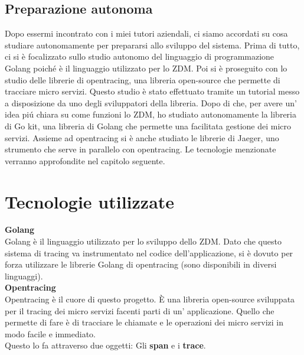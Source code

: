 \documentclass[a4paper,12pt,titlepage,italian,openany]{report}
\begin{document}
\section{Preparazione autonoma}
Dopo essermi incontrato con i miei tutori aziendali, ci siamo accordati su cosa studiare autonomamente per prepararsi allo sviluppo del sistema.
Prima di tutto, ci si è focalizzato  sullo studio autonomo del linguaggio di programmazione Golang poiché è il linguaggio utilizzato per lo ZDM\cite{zdm:1}.
Poi si è proseguito con lo studio delle librerie di opentracing, una libreria open-source che permette di tracciare micro servizi.
Questo studio è stato effettuato tramite un tutorial\cite{opentracing:2} messo a disposizione da uno degli sviluppatori della libreria. Dopo di che, per avere un' idea piú chiara su come funzioni lo ZDM,
ho studiato autonomamente la libreria di Go kit\cite{go:2}, una libreria di Golang che permette una facilitata gestione dei micro servizi.
Assieme ad opentracing si è anche studiato le librerie di Jaeger\cite{jaeger:1}, uno strumento che serve in parallelo con opentracing.
Le tecnologie menzionate verranno approfondite nel capitolo seguente.
\chapter{Tecnologie utilizzate}
\textbf{Golang}\\
Golang\cite{go:1} è il linguaggio utilizzato per lo sviluppo dello ZDM. Dato che questo sistema di tracing va instrumentato nel codice dell'applicazione, si è dovuto per forza utilizzare le librerie
Golang di opentracing (sono disponibili in diversi linguaggi).\\[12pt]

\textbf{Opentracing}\\
Opentracing\cite{opentracing:1} è il cuore di questo progetto. È una libreria open-source sviluppata per il tracing dei micro servizi facenti parti di un' applicazione.
Quello che permette di fare è di tracciare le chiamate e le operazioni dei micro servizi in modo facile e immediato.
\\Questo lo fa attraverso due oggetti: Gli \textbf{span} e i \textbf{trace}.\\
\end{document}
